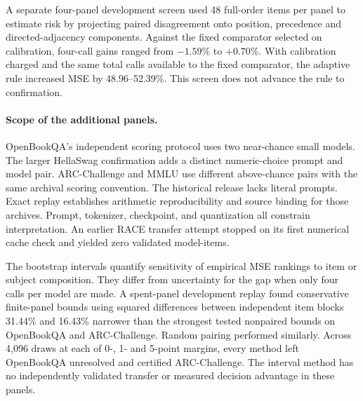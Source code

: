 A separate four-panel development screen used 48 full-order items
per panel to estimate risk by projecting paired disagreement onto
position, precedence and directed-adjacency components. Against the
fixed comparator selected on calibration, four-call gains ranged
from $-1.59$\% to $+0.70$\%. With calibration charged and the same
total calls available to the fixed comparator, the adaptive rule
increased MSE by 48.96--52.39\%. This screen does not advance the rule
to confirmation.


\paragraph{Scope of the additional panels.}
OpenBookQA's independent scoring protocol uses two near-chance small
models. The larger HellaSwag confirmation adds a distinct numeric-choice
prompt and model pair. ARC-Challenge and MMLU use different above-chance
pairs with the same archival scoring convention. The historical release
lacks literal prompts. Exact replay establishes arithmetic reproducibility
and source binding for those archives. Prompt, tokenizer, checkpoint,
and quantization all constrain interpretation.
An earlier RACE \citep{lai2017} transfer attempt stopped on its first
numerical cache check and yielded zero validated model-items.

The bootstrap intervals quantify sensitivity of empirical MSE rankings
to item or subject composition. They differ from uncertainty for the
gap when only four calls per model are made. A spent-panel development
replay found conservative finite-panel bounds using squared differences
between independent item blocks 31.44\% and 16.43\% narrower than
the strongest tested nonpaired bounds on OpenBookQA and ARC-Challenge.
Random pairing performed similarly. Across 4,096 draws at each of
0-, 1- and 5-point margins, every method left OpenBookQA unresolved and
certified ARC-Challenge. The interval method has no independently
validated transfer or measured decision advantage in these panels.


